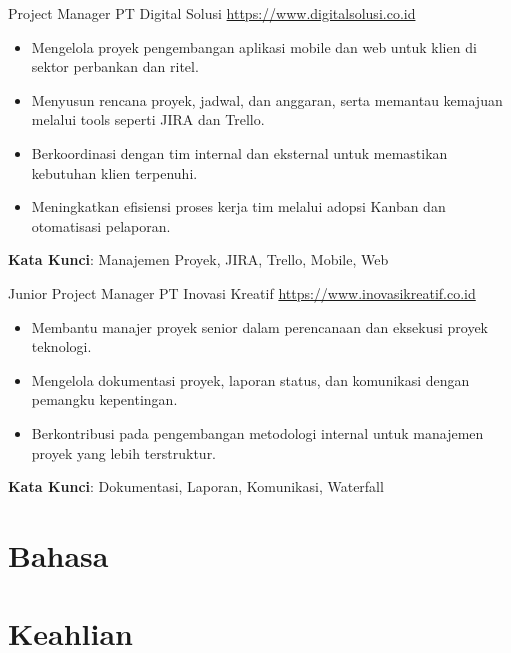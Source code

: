 \documentclass[a4paper, serif, 10pt]{moderncv}
\begin{document}
        {Project Manager}
        {PT Digital Solusi}
        {\url{https://www.digitalsolusi.co.id}}
        {}
        {\begin{itemize}
\item Mengelola proyek pengembangan aplikasi mobile dan web untuk klien di sektor perbankan dan ritel.
\item Menyusun rencana proyek, jadwal, dan anggaran, serta memantau kemajuan melalui tools seperti JIRA dan Trello.
\item Berkoordinasi dengan tim internal dan eksternal untuk memastikan kebutuhan klien terpenuhi.
\item Meningkatkan efisiensi proses kerja tim melalui adopsi Kanban dan otomatisasi pelaporan.
\end{itemize}
\textbf{Kata Kunci}: Manajemen Proyek, JIRA, Trello, Mobile, Web}

        {Junior Project Manager}
        {PT Inovasi Kreatif}
        {\url{https://www.inovasikreatif.co.id}}
        {}
        {\begin{itemize}
\item Membantu manajer proyek senior dalam perencanaan dan eksekusi proyek teknologi.
\item Mengelola dokumentasi proyek, laporan status, dan komunikasi dengan pemangku kepentingan.
\item Berkontribusi pada pengembangan metodologi internal untuk manajemen proyek yang lebih terstruktur.
\end{itemize}
\textbf{Kata Kunci}: Dokumentasi, Laporan, Komunikasi, Waterfall}
\section{Bahasa}

\section{Keahlian}

\end{document}
